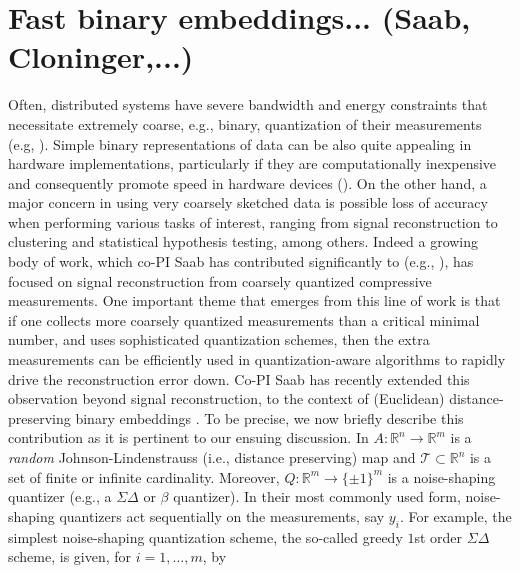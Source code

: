 \documentclass{article}
\newcommand{\comment}[3]{{\color{#1} {\bf #2 :} #3}}
\newcommand{\yoav}[1]{\comment{magenta}{Yoav}{#1}}
\newcommand{\R}{\mathbb{R}}
\begin{document}
\section{Fast binary embeddings... (Saab, Cloninger,...)}

Often, distributed systems have severe bandwidth and energy constraints that necessitate extremely
coarse, e.g., binary, quantization of their measurements (e.g, \cite{fang2014sparse,boufounos20081}). Simple binary representations of data can be also quite appealing in hardware implementations, particularly if they are computationally inexpensive and consequently promote speed in hardware devices (\cite{jacques2013robust,le2005analog}). On the other hand, a major concern in using very coarsely sketched data is possible loss of accuracy when performing various tasks of interest, ranging from signal reconstruction to clustering and statistical hypothesis testing, among others. Indeed a growing body of work, which co-PI Saab has contributed significantly to (e.g., \cite{SaabIEEEIT,knudson2016one,saab2018quantization,LybrandSaab2018,iwen2019new}), has focused on signal reconstruction from coarsely quantized compressive measurements. One important theme that emerges from this line of work  is that if one collects more coarsely quantized measurements than a critical minimal number, and uses sophisticated quantization schemes, then the extra measurements can be efficiently used in quantization-aware algorithms to rapidly drive the reconstruction error down.
Co-PI Saab has recently  extended this observation  beyond signal reconstruction, to the context of (Euclidean) distance-preserving binary embeddings \cite{huynh2018fast}. To be precise, we now briefly describe this contribution as it is pertinent to our ensuing discussion. In \cite{huynh2018fast}  $A: \R^n \to \R^m$ is a \emph{random} Johnson-Lindenstrauss (i.e., distance preserving) map and  $\mathcal{T}\subset \R^n$ is a set of finite or infinite cardinality. Moreover, $Q:\R^m \to \{\pm 1\}^m$ is a noise-shaping quantizer (e.g., a $\Sigma\Delta$ \cite{stuff} or $\beta$ \cite{stuff} quantizer). In their most commonly used form, noise-shaping quantizers act sequentially on the measurements, say $y_i$. For example, the simplest noise-shaping quantization scheme, the so-called greedy $1$st order $\Sigma\Delta$ scheme, is given, for $i=1,...,m$, by 
\end{document}
